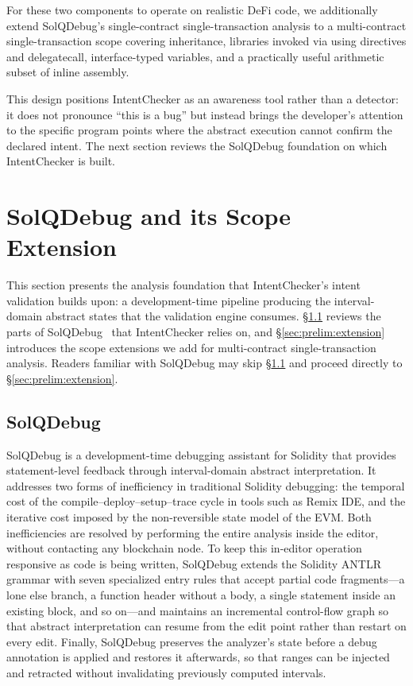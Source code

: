 \documentclass[pdflatex,sn-basic]{sn-jnl}%
\theoremstyle{thmstyleone}%
\theoremstyle{thmstyletwo}%
\theoremstyle{thmstylethree}%
\begin{document}
\smallskip
For these two components to operate on realistic DeFi code, we additionally extend SolQDebug's single-contract single-transaction analysis to a multi-contract single-transaction scope covering inheritance, libraries invoked via using directives and delegatecall, interface-typed variables, and a practically useful arithmetic subset of inline assembly.

\smallskip
This design positions IntentChecker as an awareness tool rather than a detector: it does not pronounce ``this is a bug'' but instead brings the developer's attention to the specific program points where the abstract execution cannot confirm the declared intent.
The next section reviews the SolQDebug foundation on which IntentChecker is built.

\section{SolQDebug and its Scope Extension}\label{sec:prelim}

This section presents the analysis foundation that IntentChecker's intent validation builds upon: a development-time pipeline producing the interval-domain abstract states that the validation engine consumes.
§\ref{sec:prelim:foundations} reviews the parts of SolQDebug~\citep{solqdebug} that IntentChecker relies on, and §\ref{sec:prelim:extension} introduces the scope extensions we add for multi-contract single-transaction analysis.
Readers familiar with SolQDebug may skip §\ref{sec:prelim:foundations} and proceed directly to §\ref{sec:prelim:extension}.

\subsection{SolQDebug}\label{sec:prelim:foundations}

SolQDebug is a development-time debugging assistant for Solidity that provides statement-level feedback through interval-domain abstract interpretation.
It addresses two forms of inefficiency in traditional Solidity debugging: the temporal cost of the compile--deploy--setup--trace cycle in tools such as Remix IDE, and the iterative cost imposed by the non-reversible state model of the EVM.
Both inefficiencies are resolved by performing the entire analysis inside the editor, without contacting any blockchain node.
To keep this in-editor operation responsive as code is being written, SolQDebug extends the Solidity ANTLR grammar with seven specialized entry rules that accept partial code fragments---a lone else branch, a function header without a body, a single statement inside an existing block, and so on---and maintains an incremental control-flow graph so that abstract interpretation can resume from the edit point rather than restart on every edit.
Finally, SolQDebug preserves the analyzer's state before a debug annotation is applied and restores it afterwards, so that ranges can be injected and retracted without invalidating previously computed intervals.
\end{document}
